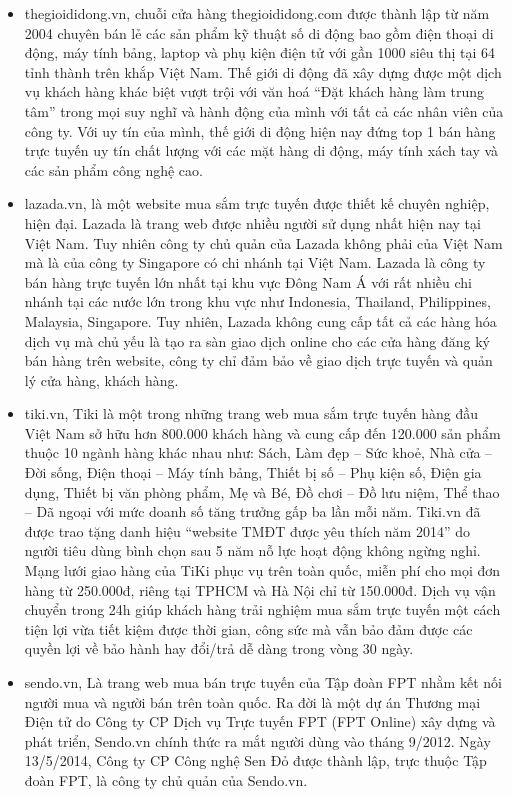 \begin{itemize}
\item	thegioididong.vn, chuỗi cửa hàng thegioididong.com được thành lập từ năm 2004 chuyên bán lẻ các sản phẩm kỹ thuật số di động bao gồm điện thoại di động, máy tính bảng, laptop và phụ kiện điện tử với gần 1000 siêu thị tại 64 tỉnh thành trên khắp Việt Nam. Thế giới di động đã xây dựng được một dịch vụ khách hàng khác biệt vượt trội với văn hoá “Đặt khách hàng làm trung tâm” trong mọi suy nghĩ và hành động của mình với tất cả các nhân viên của công ty. Với uy tín của mình, thế giới di động hiện nay đứng top 1 bán hàng trực tuyến uy tín chất lượng với các mặt hàng di động, máy tính xách tay và các sản phẩm công nghệ cao.
\item	lazada.vn, là một website mua sắm trực tuyến được thiết kế chuyên nghiệp, hiện đại. Lazada là trang web được nhiều người sử dụng nhất hiện nay tại Việt Nam. Tuy nhiên công ty chủ quản của Lazada không phải của Việt Nam mà là của công ty Singapore có chi nhánh tại Việt Nam. Lazada là công ty bán hàng trực tuyến lớn nhất tại khu vực Đông Nam Á với rất nhiều chi nhánh tại các nước lớn trong khu vực như Indonesia, Thailand, Philippines, Malaysia, Singapore. Tuy nhiên, Lazada không cung cấp tất cả các hàng hóa dịch vụ mà chủ yếu là tạo ra sàn giao dịch online cho các cửa hàng đăng ký bán hàng trên website, công ty chỉ đảm bảo về giao dịch trực tuyến và quản lý cửa hàng, khách hàng.
\item	tiki.vn, Tiki là một trong những trang web mua sắm trực tuyến hàng đầu Việt Nam sở hữu hơn 800.000 khách hàng và cung cấp đến 120.000 sản phẩm thuộc 10 ngành hàng khác nhau như: Sách, Làm đẹp – Sức khoẻ, Nhà cửa – Đời sống, Điện thoại – Máy tính bảng, Thiết bị số – Phụ kiện số, Điện gia dụng, Thiết bị văn phòng phẩm, Mẹ và Bé, Đồ chơi – Đồ lưu niệm, Thể thao – Dã ngoại với mức doanh số tăng trưởng gấp ba lần mỗi năm. Tiki.vn đã được trao tặng danh hiệu “website TMĐT được yêu thích năm 2014” do người tiêu dùng bình chọn sau 5 năm nỗ lực hoạt động không ngừng nghỉ. Mạng lưới giao hàng của TiKi phục vụ trên toàn quốc, miễn phí cho mọi đơn hàng từ 250.000đ, riêng tại TPHCM và Hà Nội chỉ từ 150.000đ. Dịch vụ vận chuyển trong 24h giúp khách hàng trải nghiệm mua sắm trực tuyến một cách tiện lợi vừa tiết kiệm được thời gian, công sức mà vẫn bảo đảm được các quyền lợi về bảo hành hay đổi/trả dễ dàng trong vòng 30 ngày.
\item sendo.vn, Là trang web mua bán trực tuyến của Tập đoàn FPT nhằm kết nối người mua và người bán trên toàn quốc. Ra đời là một dự án Thương mại Điện tử do Công ty CP Dịch vụ Trực tuyến FPT (FPT Online) xây dựng và phát triển, Sendo.vn chính thức ra mắt người dùng vào tháng 9/2012. Ngày 13/5/2014, Công ty CP Công nghệ Sen Đỏ được thành lập, trực thuộc Tập đoàn FPT, là công ty chủ quản của Sendo.vn.

\end{itemize}
